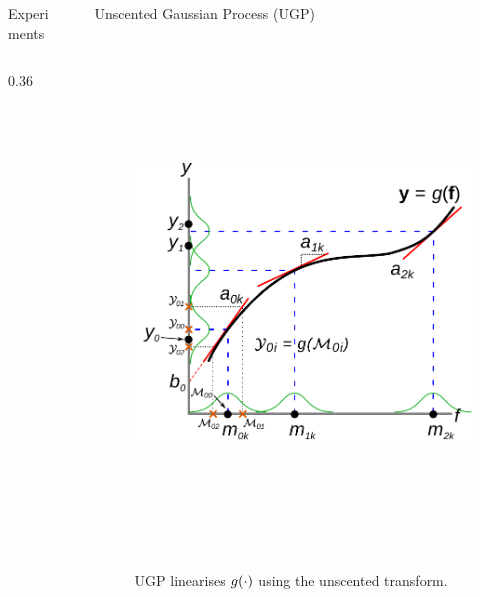 \documentclass[final]{beamer}
\newlength{\sepwid}
\newlength{\onecolwid}
\newlength{\twocolwid}
\begin{document}
\begin{frame}[t]
\begin{columns}[t]
\begin{column}{\twocolwid}
\begin{columns}[t,totalwidth=\twocolwid]
\begin{column}{\twocolwid}
\begin{block}{Experiments}
\begin{columns}
\begin{column}{0.36\twocolwid}
\end{column}
%




\end{columns}
\end{block}


\end{column} %


\end{columns} %

\end{column} %

\begin{column}{\sepwid}\end{column} %

\begin{column}{\onecolwid} %

\begin{block}{Unscented Gaussian Process (UGP)}
%
\begin{figure}
    \includegraphics[height=14cm]{fig/statlin_gp}
 \caption{UGP linearises $g\!\left({{\cdot}}\right)$ using the unscented transform.}
\end{figure}        


\end{block}
\end{column}
\end{columns}
\end{frame}
\end{document}
